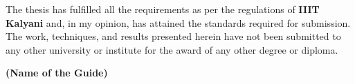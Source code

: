 \noindent \par The thesis has fulfilled all the requirements as per
the regulations of \textbf{IIIT Kalyani} and, in my opinion, has
attained the standards required for submission. The work,
techniques, and results presented herein have not been submitted to
any other university or institute for the award of any other degree
or diploma.

\vspace{1in}

\begin{flushright}
    \textbf{(Name of the Guide)}\\
    \\
    \\
    \\
\end{flushright}
